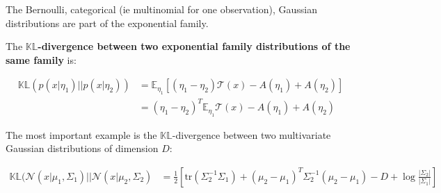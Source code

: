 The Bernoulli, categorical (ie multinomial for one observation), Gaussian distributions are part of the exponential family.

The \textbf{$\mathbb{KL}$-divergence between two exponential family distributions of the same family} is:

\begin{align}
    \mathbb{KL}(p(x\vert \eta_1) \vert \vert p(x \vert \eta_2)) &= \mathbb{E}_{\eta_1}\left[ (\eta_1 - \eta_2) \mathcal{T}(x) - A(\eta_1) + A(\eta_2)\right] \\
    &= (\eta_1 - \eta_2)^T \mathbb{E}_{\eta_1}\mathcal{T}(x) - A(\eta_1) + A(\eta_2)
\end{align}

The most important example is the $\mathbb{KL}$-divergence between two multivariate Gaussian distributions of dimension $D$:

\begin{tcolorbox}[colback=blue!5!white,colframe=black!75!black,title=KL between two multivariate Gaussians of dimension $D$]
\begin{align}
    \label{KL-two-gaussians}
    \mathbb{KL}(\mathcal{N}(x \vert \mu_1, \Sigma_1) \vert\vert \mathcal{N}(x \vert \mu_2, \Sigma_2) &=
    \frac{1}{2}\left[ \text{tr}(\Sigma_2^{-1}\Sigma_1) + (\mu_2-\mu_1)^T \Sigma_2^{-1}(\mu_2-\mu_1) -D + \log{\frac{\vert \Sigma_2\vert}{\vert \Sigma_1 \vert}}\right]
\end{align}
\end{tcolorbox}